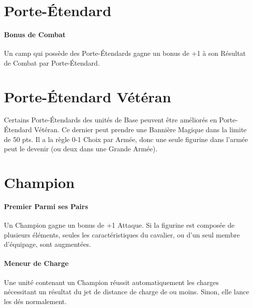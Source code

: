 \section{Porte-Étendard}

\paragraph{Bonus de Combat}

Un camp qui possède des Porte-Étendards gagne un bonus de +1 à son Résultat de Combat par Porte-Étendard.


\section{Porte-Étendard Vétéran}

Certains Porte-Étendards des unités de Base peuvent être améliorés en Porte-Étendard Vétéran. Ce dernier peut prendre une Bannière Magique dans la limite de 50 pts. Il a la règle 0-1 Choix par Armée, donc une seule figurine dans l'armée peut le devenir (ou deux dans une Grande Armée).

\section{Champion}
\label{champion}

\paragraph{Premier Parmi ses Pairs}

Un Champion gagne un bonus de +1 Attaque. Si la figurine est composée de plusieurs éléments, seules les caractéristiques du cavalier, ou d'un seul membre d'équipage, sont augmentées.

\paragraph{Meneur de Charge}

Une unité contenant un Champion réussit automatiquement les charges nécessitant un résultat du jet de distance de charge de  ou moins. Sinon, elle lance les dés normalement.


